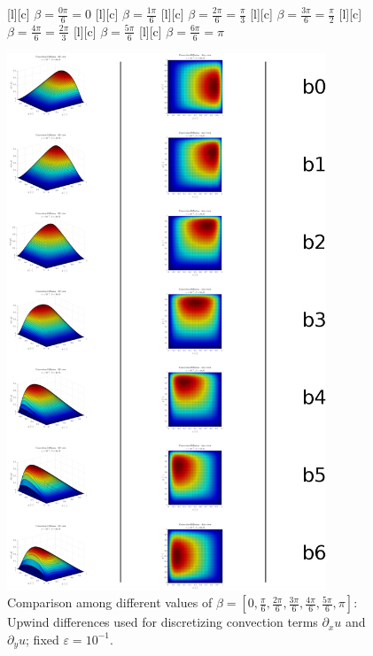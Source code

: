 \begin{figure}[ht!]
	\centering
	\footnotesize

	[c] {$\displaystyle \beta = \frac{0\pi}{6} = 0$}
	[c] {$\displaystyle \beta = \frac{1\pi}{6}$}
	[c] {$\displaystyle \beta = \frac{2\pi}{6} = \frac{\pi}{3}$}
	[c] {$\displaystyle \beta = \frac{3\pi}{6} = \frac{\pi}{2}$}
	[c] {$\displaystyle \beta = \frac{4\pi}{6} = \frac{2\pi}{3}$}
	[c] {$\displaystyle \beta = \frac{5\pi}{6}$}
	[c] {$\displaystyle \beta = \frac{6\pi}{6} = \pi$}

	\includegraphics[width=0.85\textwidth]{fixedUpwind_variatedBeta.eps}
	\caption{Comparison among different values of
		$\displaystyle \beta = \left[0, \frac{\pi}{6}, \frac{2\pi}{6}, \frac{3\pi}{6}, \frac{4\pi}{6}, \frac{5\pi}{6}, \pi\right]$:
		Upwind differences used for discretizing convection terms $\partial_{x}u$ and $\partial_{y}u$;
		fixed $\varepsilon = 10^{-1}$.}
	\label{\LABEL}
\end{figure}